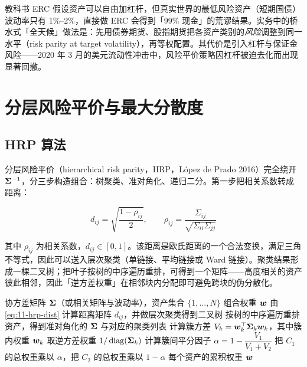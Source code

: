 \begin{appbox}[风险平价的实践变体]
教科书 ERC 假设资产可以自由加杠杆，但真实世界的最低风险资产（短期国债）波动率只有 1\%--2\%，直接做 ERC 会得到「99\% 现金」的荒谬结果。实务中的桥水式「全天候」做法是：先用债券期货、股指期货把各资产类别的\emph{风险}调整到同一水平（risk parity at target volatility），再等权配置。其代价是引入杠杆与保证金风险——2020 年 3 月的美元流动性冲击中，风险平价策略因杠杆被迫去化而出现显著回撤。
\end{appbox}

\section{分层风险平价与最大分散度}

\subsection{HRP 算法}

分层风险平价（hierarchical risk parity，HRP，López de Prado 2016）完全绕开 $\bm{\Sigma}^{-1}$，分三步构造组合：树聚类、准对角化、递归二分。第一步把相关系数转成距离：

\begin{equation}\label{eq:11-hrp-dist}
  d_{ij} = \sqrt{\frac{1-\rho_{ij}}{2}},
  \qquad \rho_{ij} = \frac{\Sigma_{ij}}{\sqrt{\Sigma_{ii}\Sigma_{jj}}}
\end{equation}

其中 $\rho_{ij}$ 为相关系数，$d_{ij}\in[0,1]$。该距离是欧氏距离的一个合法变换，满足三角不等式，因此可以送入层次聚类（单链接、平均链接或 Ward 链接）。聚类结果形成一棵二叉树；把叶子按树的中序遍历重排，可得到一个矩阵——高度相关的资产彼此相邻，因此「逆方差权重」在相邻块内分配即可避免跨块的伪分散化。

\begin{algorithm}[htbp]
\caption{分层风险平价（HRP）}\label{alg:11-hrp}
\begin{algorithmic}[1]
\Require 协方差矩阵 $\bm{\Sigma}$（或相关矩阵与波动率），资产集合 $\{1,\dots,N\}$
\Ensure 组合权重 $\bm{w}$
\State 由 \cref{eq:11-hrp-dist} 计算距离矩阵 $d_{ij}$，并做层次聚类得到二叉树
\State 按树的中序遍历重排资产，得到准对角化的 $\bm{\Sigma}$ 与对应的聚类列表
  \State 计算簇方差 $V_k = \bm{w}_k^{\top}\bm{\Sigma}_{k}\bm{w}_k$，其中簇内权重 $\bm{w}_k$ 取逆方差权重 $1/\operatorname{diag}(\bm{\Sigma}_k)$
  \State 计算簇间平分因子 $\alpha = 1 - \dfrac{V_1}{V_1 + V_2}$
  \State 把 $C_1$ 的总权重乘以 $\alpha$，把 $C_2$ 的总权重乘以 $1-\alpha$
\EndFor
\State \Return 每个资产的累积权重 $\bm{w}$
\end{algorithmic}
\end{algorithm}

